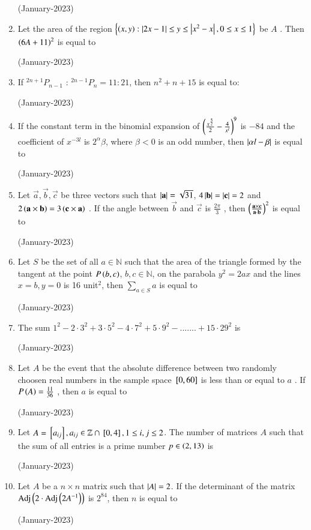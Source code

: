 \documentclass[journal]{IEEEtran}
\begin{document}
\begin{enumerate}
\hfill(January-2023)

\item Let the area of the region $\left\{\left(x,y\right) : \left\vert2x-1\right\vert \leq y \leq \left\vert x^2 - x\right\vert, 0 \leq x \leq 1\right\}$
 be $A$ . Then $\left(6A + 11\right)^2$  
 is equal to 

 \hfill(January-2023)

 \item If $^{2n+1}P_{n-1} \text{ : } ^{2n-1}P_n = 11:21$, then $n^2 + n +15$ is equal to:

\hfill (January-2023)

\item If the constant term in the binomial expansion of 
$\left(\frac{x^{\frac{5}{2}}}{2} - \frac{4}{x^l}\right)^9$ is $-84$ and the coefficient of $x^{-3l}$ 
 is $2^{\alpha}\beta$, where $\beta < 0$
 is an odd number, then $\left\vert\alpha l - \beta\right\vert$
 is equal to

 \hfill(January-2023)

 \item Let $\vec{a}, \vec{b}, \vec{c}$
 be three vectors such that
$\left\vert\mathbf{a}\right\vert = \sqrt{31}$, $4\left\vert\mathbf{b}\right\vert = \left\vert\mathbf{c}\right\vert = 2$
 and $2\left(\mathbf{a} \times \mathbf{b}\right) = 3 \left(\mathbf{c} \times \mathbf{a}\right)$
. If the angle between $\vec{b}$
 and $\vec{c}$
 is $\frac{2\pi}{3}$
, then $\left(\frac{\mathbf{a} \times \mathbf{c}}{\mathbf{a}\cdot \mathbf{b}}\right)^2$ is equal to

\hfill (January-2023)

\item Let $S$ be the set of all $a \in \mathbb{N}$ such that the area of the triangle formed by the tangent at the point $P\left(b,c\right)$, $b,c \in \mathbb{N}$, on the parabola $y^2 = 2ax $ and the lines $x = b, y = 0 $ is 16 unit$^2$, then $\sum_{a \in S} a $ is equal to 

\hfill (January-2023)

\item The sum $1^2 - 2\cdot3^2 + 3\cdot5^2 - 4\cdot7^2 + 5\cdot9^2 - ....... + 15\cdot29^2$ is 

\hfill(January-2023)

\item Let $A$ be the event that the absolute difference between two randomly choosen real numbers in the sample space ${}\left[0,60\right]$
 is less than or equal to $a$ . If $P\left(A\right) = \frac{11}{36}$ , then $a$ 
 is equal to 

 \hfill (January-2023)

 \item Let $A = {}\left[a_{ij}\right], a_{ij} \in \mathbb{Z} \cap {}\left[0,4\right], 1 \leq i,j \leq 2$. 
The number of matrices $A$ such that the sum of all entries is a prime number $p \in \left(2,13\right)$ is 

\hfill (January-2023)

\item Let $A$ be a $n \times n $ matrix such that $\left\vert A\right\vert = 2$. If the determinant of the matrix $\operatorname{Adj}\left(2\cdot \operatorname{Adj}\left(2A^{-1}\right)\right)$ is $2^{84}$, then $n$ is equal to 

\hfill (January-2023)
\end{enumerate}
\end{document}

